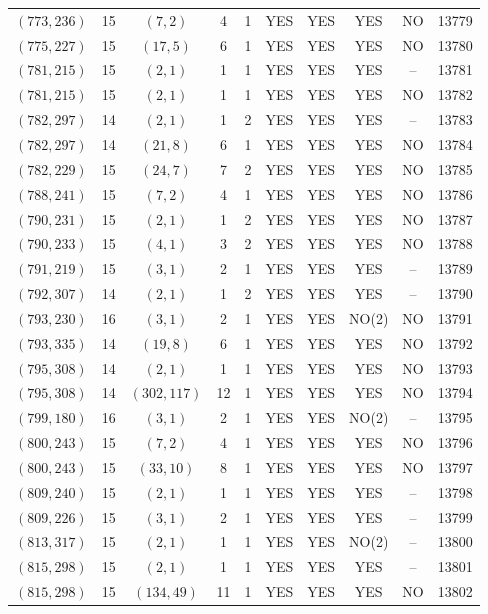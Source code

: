 \begin{longtable}{|c|c|c|c|c|c|c|c|c|c|}
$(773, 236)$ & 15 & $(7, 2)$ & 4 & 1 & YES & YES & YES & NO & 13779\\
$(775, 227)$ & 15 & $(17, 5)$ & 6 & 1 & YES & YES & YES & NO & 13780\\
$(781, 215)$ & 15 & $(2, 1)$ & 1 & 1 & YES & YES & YES & -- & 13781\\
$(781, 215)$ & 15 & $(2, 1)$ & 1 & 1 & YES & YES & YES & NO & 13782\\
$(782, 297)$ & 14 & $(2, 1)$ & 1 & 2 & YES & YES & YES & -- & 13783\\
$(782, 297)$ & 14 & $(21, 8)$ & 6 & 1 & YES & YES & YES & NO & 13784\\
$(782, 229)$ & 15 & $(24, 7)$ & 7 & 2 & YES & YES & YES & NO & 13785\\
$(788, 241)$ & 15 & $(7, 2)$ & 4 & 1 & YES & YES & YES & NO & 13786\\
$(790, 231)$ & 15 & $(2, 1)$ & 1 & 2 & YES & YES & YES & NO & 13787\\
$(790, 233)$ & 15 & $(4, 1)$ & 3 & 2 & YES & YES & YES & NO & 13788\\
$(791, 219)$ & 15 & $(3, 1)$ & 2 & 1 & YES & YES & YES & -- & 13789\\
$(792, 307)$ & 14 & $(2, 1)$ & 1 & 2 & YES & YES & YES & -- & 13790\\
$(793, 230)$ & 16 & $(3, 1)$ & 2 & 1 & YES & YES & NO(2) & NO & 13791\\
$(793, 335)$ & 14 & $(19, 8)$ & 6 & 1 & YES & YES & YES & NO & 13792\\
$(795, 308)$ & 14 & $(2, 1)$ & 1 & 1 & YES & YES & YES & NO & 13793\\
$(795, 308)$ & 14 & $(302, 117)$ & 12 & 1 & YES & YES & YES & NO & 13794\\
$(799, 180)$ & 16 & $(3, 1)$ & 2 & 1 & YES & YES & NO(2) & -- & 13795\\
$(800, 243)$ & 15 & $(7, 2)$ & 4 & 1 & YES & YES & YES & NO & 13796\\
$(800, 243)$ & 15 & $(33, 10)$ & 8 & 1 & YES & YES & YES & NO & 13797\\
$(809, 240)$ & 15 & $(2, 1)$ & 1 & 1 & YES & YES & YES & -- & 13798\\
$(809, 226)$ & 15 & $(3, 1)$ & 2 & 1 & YES & YES & YES & -- & 13799\\
$(813, 317)$ & 15 & $(2, 1)$ & 1 & 1 & YES & YES & NO(2) & -- & 13800\\
$(815, 298)$ & 15 & $(2, 1)$ & 1 & 1 & YES & YES & YES & -- & 13801\\
$(815, 298)$ & 15 & $(134, 49)$ & 11 & 1 & YES & YES & YES & NO & 13802\\

\end{longtable}

